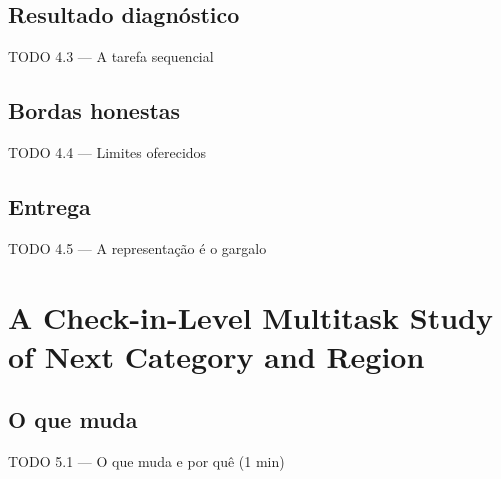 \documentclass{beamer}
\begin{document}
\subsection{Resultado diagnóstico}
\begin{frame}{TODO 4.3 --- A tarefa sequencial}
\end{frame}

\subsection{Bordas honestas}
\begin{frame}{TODO 4.4 --- Limites oferecidos}
\end{frame}

\subsection{Entrega}
\begin{frame}{TODO 4.5 --- A representação é o gargalo}
\end{frame}


\section[Check2HGI]{A Check-in-Level Multitask Study of Next Category and Region}  %

\subsection{O que muda}
\begin{frame}{TODO 5.1 --- O que muda e por quê (1 min)}
\end{frame}
\end{document}

